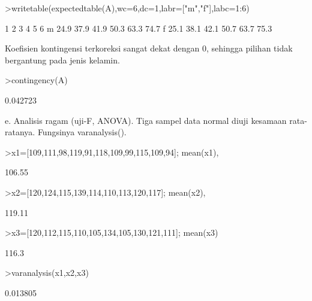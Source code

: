 \documentclass[a4paper,10pt]{article}
\begin{document}
\begin{eulernotebook}
\begin{eulercomment}
\begin{eulercomment}
\begin{eulercomment}
\begin{eulercomment}
\begin{eulercomment}
\begin{eulercomment}
\begin{eulercomment}
\begin{eulercomment}
\begin{eulercomment}
\begin{eulercomment}
\begin{eulercomment}
\begin{eulercomment}
\begin{eulercomment}
\begin{eulercomment}
\begin{eulercomment}
\begin{eulercomment}
\begin{eulercomment}
\begin{eulercomment}
\begin{eulercomment}
\begin{eulercomment}
\begin{eulercomment}
\begin{eulercomment}
\begin{eulerprompt}
>writetable(expectedtable(A),wc=6,dc=1,labr=["m","f"],labc=1:6)
\end{eulerprompt}
\begin{euleroutput}
             1     2     3     4     5     6
       m  24.9  37.9  41.9  50.3  63.3  74.7
       f  25.1  38.1  42.1  50.7  63.7  75.3
\end{euleroutput}
\begin{eulercomment}
Koefisien kontingensi terkoreksi sangat dekat dengan 0, sehingga pilihan tidak bergantung
pada jenis kelamin.
\end{eulercomment}
\begin{eulerprompt}
>contingency(A)
\end{eulerprompt}
\begin{euleroutput}
  0.042723
\end{euleroutput}
\begin{eulercomment}
e. Analisis ragam (uji-F, ANOVA). Tiga sampel data normal diuji kesamaan rata-ratanya.
Fungsinya varanalysis().
\end{eulercomment}
\begin{eulerprompt}
>x1=[109,111,98,119,91,118,109,99,115,109,94]; mean(x1),
\end{eulerprompt}
\begin{euleroutput}
  106.55
\end{euleroutput}
\begin{eulerprompt}
>x2=[120,124,115,139,114,110,113,120,117]; mean(x2),
\end{eulerprompt}
\begin{euleroutput}
  119.11
\end{euleroutput}
\begin{eulerprompt}
>x3=[120,112,115,110,105,134,105,130,121,111]; mean(x3)
\end{eulerprompt}
\begin{euleroutput}
  116.3
\end{euleroutput}
\begin{eulerprompt}
>varanalysis(x1,x2,x3)
\end{eulerprompt}
\begin{euleroutput}
  0.013805
\end{euleroutput}
\begin{eulercomment}

\end{eulercomment}
\end{eulercomment}
\end{eulercomment}
\end{eulercomment}
\end{eulercomment}
\end{eulercomment}
\end{eulercomment}
\end{eulercomment}
\end{eulercomment}
\end{eulercomment}
\end{eulercomment}
\end{eulercomment}
\end{eulercomment}
\end{eulercomment}
\end{eulercomment}
\end{eulercomment}
\end{eulercomment}
\end{eulercomment}
\end{eulercomment}
\end{eulercomment}
\end{eulercomment}
\end{eulercomment}
\end{eulercomment}
\end{eulernotebook}
\end{document}
